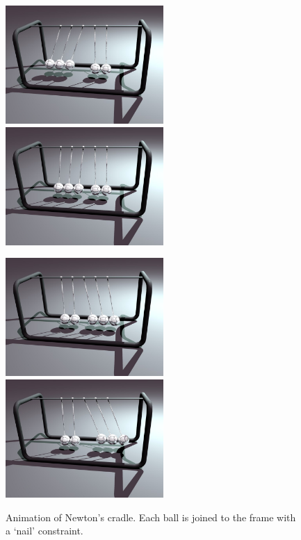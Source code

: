 \begin{figure}
\centerline{\includegraphics[width=60mm,height=45mm]{figures/cradle1} \hspace{5mm}
            \includegraphics[width=60mm,height=45mm]{figures/cradle2}}\vspace{5mm}
\centerline{\includegraphics[width=60mm,height=45mm]{figures/cradle3} \hspace{5mm}
            \includegraphics[width=60mm,height=45mm]{figures/cradle4}}
\caption{Animation of Newton's cradle. Each ball is joined to the frame with a `nail'
    constraint.\label{sampleCradle}}
\end{figure}

